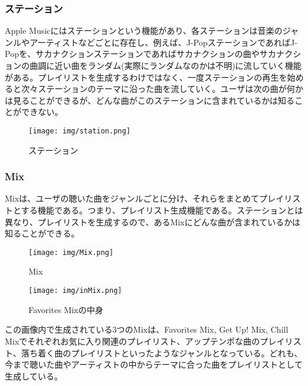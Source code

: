 \documentclass{jsarticle}
\begin{document}
\subsubsection{ステーション}
Apple Musicにはステーションという機能があり、各ステーションは音楽のジャンルやアーティストなどごとに存在し、例えば、J-PopステーションであればJ-Popを、サカナクションステーションであればサカナクションの曲やサカナクションの曲調に近い曲をランダム(実際にランダムなのかは不明)に流していく機能がある。プレイリストを生成するわけではなく、一度ステーションの再生を始めると次々ステーションのテーマに沿った曲を流していく。ユーザは次の曲が何かは見ることができるが、どんな曲がこのステーションに含まれているかは知ることができない。
\begin{figure}[htbp]
    \begin{center}
        \texttt{[image: img/station.png]}
        \caption{ステーション}
        \label{fig:station}
    \end{center}
\end{figure}
\subsubsection{Mix}
Mixは、ユーザの聴いた曲をジャンルごとに分け、それらをまとめてプレイリストとする機能である。つまり、プレイリスト生成機能である。ステーションとは異なり、プレイリストを生成するので、あるMixにどんな曲が含まれているかは知ることができる。
\begin{figure}[htbp]
    \begin{minipage}[b]{0.48\linewidth}
        \begin{center}
            \texttt{[image: img/Mix.png]}
            \caption{Mix}
            \label{fig:Mix}
        \end{center}
    \end{minipage}
    \begin{minipage}[b]{0.48\linewidth}
        \begin{center}
            \texttt{[image: img/inMix.png]}
            \caption{Favorites Mixの中身}
            \label{fig:inMix}
        \end{center}
    \end{minipage}
\end{figure}
\par この画像内で生成されている3つのMixは、Favorites Mix, Get Up! Mix, Chill Mixでそれぞれお気に入り関連のプレイリスト、アップテンポな曲のプレイリスト、落ち着く曲のプレイリストといったようなジャンルとなっている。どれも、今まで聴いた曲やアーティストの中からテーマに合った曲をプレイリストとして生成している。
\end{document}
